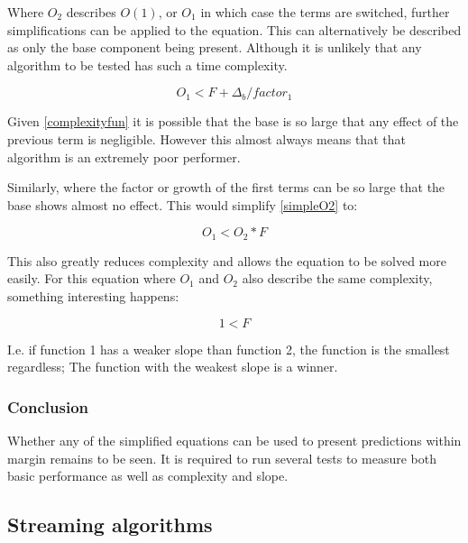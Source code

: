 \documentclass[11pt,a4paper]{report}
\begin{document}
Where $O_2$ describes $O(1)$, or $O_1$ in which case the terms are switched, further simplifications can be applied to the equation. This can alternatively be described as only the base component being present. Although it is unlikely that any algorithm to be tested has such a time complexity.

\begin{equation}
O_1 < F + \Delta_b / factor_1
\end{equation}

Given \ref{complexityfun} it is possible that the base is so large that any effect of the previous term is negligible. However this almost always means that that algorithm is an extremely poor performer.

Similarly, where the factor or growth of the first terms can be so large that the base shows almost no effect. This would simplify \ref{simpleO2} to:

\begin{equation}
O_1 < O_2 * F
\end{equation}

This also greatly reduces complexity and allows the equation to be solved more easily. For this equation where $O_1$ and $O_2$ also describe the same complexity, something interesting happens:

\begin{equation}
1 < F
\end{equation}

I.e. if function 1 has a weaker slope than function 2, the function is the smallest regardless; The function with the weakest slope is a winner.

\subsubsection{Conclusion}

Whether any of the simplified equations can be used to present predictions within margin remains to be seen. It is required to run several tests to measure both basic performance as well as complexity and slope.

\subsection{Streaming algorithms}
\end{document}

